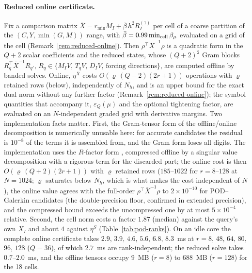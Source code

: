 \documentclass[hidelinks]{siamart251216}
\begin{document}
\paragraph{Reduced online certificate.}
Fix a comparison matrix $\bar X=r_{\min}M_I+\bar\beta\,h^2R^{(1)}_I$ per cell of a coarse
partition of the $(C,Y,\min(G,M))$ range, with $\bar\beta=0.99\min_{\rm cell}\beta_\mu$ evaluated on
a grid of the cell (Remark~\ref{rem:reduced-online}).  Then $\rho^\top\bar X^{-1}\rho$ is a quadratic form in the
$Q+2$ scalar coefficients and the reduced states, whose $(Q+2)^2$ Gram blocks
$R_q^\top\bar X^{-1}R_{q'}$, $R_q\in\{M_IV,\,T_qV,\,D_IV,\,\text{forcing directions}\}$, are
computed offline by banded solves.  Online, $\eta^{\bar X}$ costs $O(\varrho\,(Q+2)(2r+1))$ operations
with $\varrho$ retained rows (below), independently of $N_h$, and is an upper bound for the exact dual norm without any further factor
(Remark~\ref{rem:reduced-online}); the symbol quantities that accompany it, $\varepsilon_Q(\mu)$ and
the optional tightening factor, are evaluated on an $N$-independent graded grid with derivative
margins.  Two implementation facts matter.  First, the Gram-tensor form of the offline/online
decomposition is numerically unusable here: for accurate candidates the residual is $10^{-8}$ of
the terms it is assembled from, and the Gram form loses all digits.  The implementation uses the
$R$-factor form \cite{CasenaveErnLelievre2014,BuhrEngwerOhlbergerRave2014}, compressed offline by a
singular value decomposition with a rigorous term for the discarded part; the online cost is then
$O(\varrho\,(Q+2)(2r+1))$ with $\varrho$ retained rows ($185$--$1022$ for $r=8$--$128$ at $N=1024$;
$\varrho$ saturates below $N_h$, which is what makes the cost independent of $N$), the online
value agrees with the full-order $\rho^\top\bar X^{-1}\rho$ to $2\times10^{-10}$ for POD--Galerkin
candidates (the double-precision floor, confirmed in extended precision), and the compressed bound
exceeds the uncompressed one by at most $5\times10^{-4}$ relative.  Second, the cell norm costs a
factor $1.87$ (median) against the query's own $X_I$ and about $4$ against $\eta^S$
(Table~\ref{tab:pod-ranks}).  On an idle core the complete online certificate takes
$2.9$, $3.9$, $4.6$, $5.6$, $6.8$, $8.3$~ms at $r=8$, $48$, $64$, $80$, $96$, $128$ ($Q=36$), of which
$2.7$~ms are rank-independent; the reduced solve takes $0.7$--$2.0$~ms, and the offline tensors
occupy $9$~MB ($r=8$) to $688$~MB ($r=128$) for the 18 cells.
\end{document}
